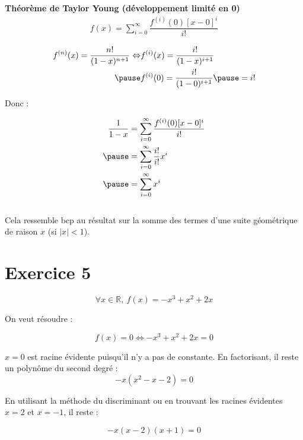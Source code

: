 \documentclass[9pt,handout,professionalfonts,hyperref]{beamer}
\begin{document}
\begin{frame}
	
	\textbf{Théorème de Taylor Young (développement limité en 0)}
	\[\begin{aligned}
	f(x)=\sum_{i=0}^{\infty}\dfrac{f^{(i)}(0)[x-0]^i}{i!}
	\end{aligned}\]
	\pause
	
	
\[\begin{aligned}
f^{(n)}(x) =\dfrac{n!}{(1-x)^{n+1}} \Leftrightarrow 
&f^{(i)}(x) =\dfrac{i!}{(1-x)^{i+1}}\\
\pause &f^{(i)}(0) =\dfrac{i!}{(1-0)^{i+1}} \pause = i! 
\end{aligned}\]

Donc : 

\[\begin{aligned}
\dfrac{1}{1-x}
&=\sum_{i=0}^{\infty}\dfrac{f^{(i)}(0)[x-0]^i}{i!}\\
\pause &=\sum_{i=0}^{\infty}\dfrac{i!}{i!}x^i \\
\pause &=\sum_{i=0}^{\infty}x^i 
\end{aligned}\]\\

Cela ressemble bcp au résultat sur la somme des termes d'une suite géométrique de raison $x$ (si $|x|<1$).
\end{frame}

\section{Exercice 5}

\begin{frame}
$$
\forall x \in \mathbb{R}, ~f(x)=-x^3+x^2+2x
$$

\pause On veut résoudre :

$$f(x)=0 \Leftrightarrow -x^3+x^2+2x=0$$
\pause

$x=0$ est racine évidente puisqu'il n'y a pas de constante. \pause En factorisant, il reste un polynôme du second degré : 
$$-x(x^2-x-2)=0$$

\pause En utilisant la méthode du discriminant ou en trouvant les racines évidentes $x=2$ et $x=-1$, il reste :

$$-x(x-2)(x+1)=0$$

\end{frame}
\end{document}
